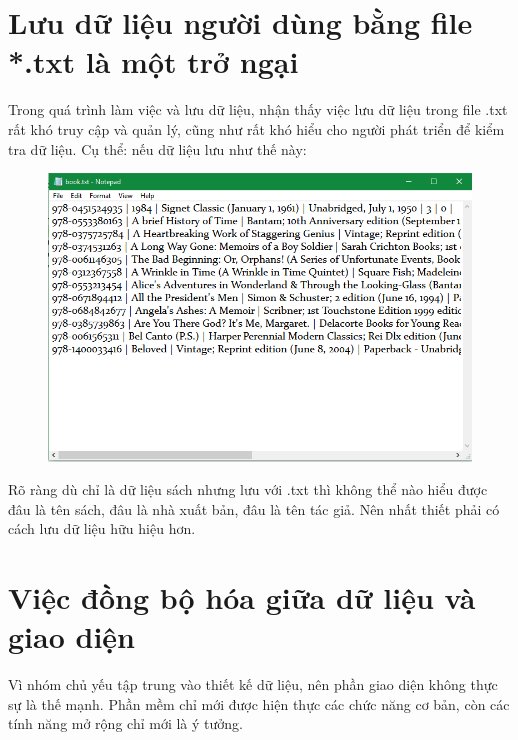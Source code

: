 \documentclass[12pt,a4paper]{report}
\begin{document}
    \section{Lưu dữ liệu người dùng bằng file *.txt là một trở ngại}
    Trong quá trình làm việc và lưu dữ liệu, nhận thấy việc lưu dữ liệu trong file .txt rất khó truy cập và quản lý, cũng như rất khó hiểu cho người phát triển để kiểm tra dữ liệu. Cụ thể: nếu dữ liệu lưu như thế này:
        \begin{figure}[H]
            \centering
            \label{F:booktext}
            \includegraphics[scale = .7]{booktext.png}
        \end{figure}
    Rõ ràng dù chỉ là dữ liệu sách nhưng lưu với .txt thì không thể nào hiểu được đâu là tên sách, đâu là nhà xuất bản, đâu là tên tác giả. Nên nhất thiết phải có cách lưu dữ liệu hữu hiệu hơn.\\
    \section{Việc đồng bộ hóa giữa dữ liệu và giao diện}
    Vì nhóm chủ yếu tập trung vào thiết kế dữ liệu, nên phần giao diện không thực sự là thế mạnh. Phần mềm chỉ mới được hiện thực các chức năng cơ bản, còn các tính năng mở rộng chỉ mới là ý tưởng.
\end{document}
